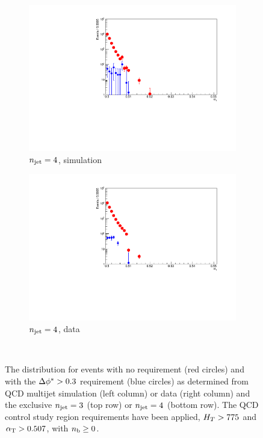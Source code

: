 \begin{figure}[h!]
\begin{subfigure}[b]{0.46\textwidth}
    \includegraphics[width=\textwidth]{Figs/dphi/chris2/qcd_mc/dphi_incl/dphi_eq4j_ge0b_775}
    \caption{$n_{\text{jet}} = 4$, simulation}
    \label{fig:dphi_acceptance_sim_4j}
  \end{subfigure}
  \begin{subfigure}[b]{0.46\textwidth}
    \includegraphics[width=\textwidth]{Figs/dphi/chris2/data/dphi_incl/dphi_eq4j_ge0b_775}
    \caption{$n_{\text{jet}} = 4$, data}
    \label{fig:dphi_acceptance_data_4j}
  \end{subfigure}\\
  \caption{The \alphat distribution for events with no \dphistar
    requirement (red circles) and with the $\Delta \phi^* > 0.3$
    requirement (blue circles) as determined from QCD multijet
    simulation (left column) or data (right column) and the exclusive
    $n_{\text{jet}} =3$
    (top row) or $n_{\text{jet}} = 4$ (bottom row). The QCD control study region
    requirements have been applied, $H_T > 775$ \gev and $\alpha_{\text{T}} > 0.507$, with
    $n_{\text{b}} \geq 0$.}
    \label{fig:data_pred_dphistar_eff}
\end{figure}

